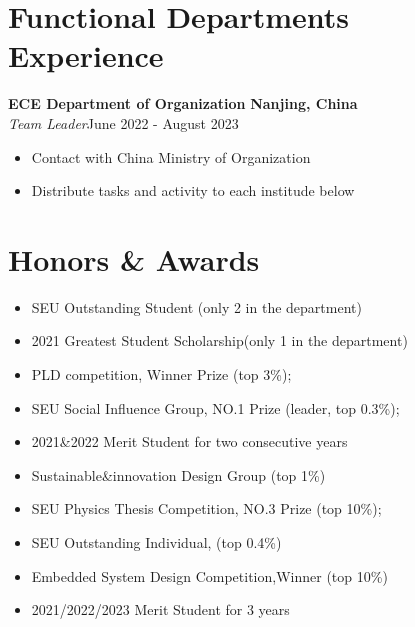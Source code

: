 \documentclass[letterpaper,11pt]{article}
\begin{document}
\vspace{-9pt}
\vspace{2pt}

\section{\textbf{Functional Departments Experience}}
{\bf ECE Department of Organization}  \hfill{\textbf{Nanjing, China} }\\
\textit{Team Leader}\hfill{June 2022 - August 2023}\\

\begin{itemize}
    \item Contact with China Ministry of Organization
    \item Distribute tasks and activity to each institude below
\end{itemize}
\vspace{2pt}


\section{\textbf{Honors \& Awards}}
\begin{itemize}
\item SEU Outstanding Student (only 2 in the department)
\item 2021 Greatest Student Scholarship(only 1 in the department)
\item PLD competition, Winner Prize (top 3\%);
\item SEU Social Influence Group, NO.1 Prize (leader, top 0.3\%);
    \item 2021\&2022 Merit Student  for two consecutive years
    \item Sustainable\&innovation Design Group (top 1\%)
    \item SEU Physics Thesis Competition, NO.3 Prize (top 10\%);
    \item SEU Outstanding Individual, (top 0.4\%)
    \item Embedded System Design Competition,Winner (top 10\%)
    \item 2021/2022/2023 Merit Student for 3 years


    
\end{itemize}
\vspace{-9pt}
\end{document}

